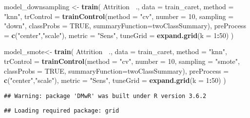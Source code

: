 \documentclass[
]{article}
\newenvironment{Shaded}{\begin{snugshade}}{\end{snugshade}}
\newcommand{\DataTypeTok}[1]{\textcolor[rgb]{0.13,0.29,0.53}{#1}}
\newcommand{\DecValTok}[1]{\textcolor[rgb]{0.00,0.00,0.81}{#1}}
\newcommand{\KeywordTok}[1]{\textcolor[rgb]{0.13,0.29,0.53}{\textbf{#1}}}
\newcommand{\NormalTok}[1]{#1}
\newcommand{\OperatorTok}[1]{\textcolor[rgb]{0.81,0.36,0.00}{\textbf{#1}}}
\newcommand{\OtherTok}[1]{\textcolor[rgb]{0.56,0.35,0.01}{#1}}
\newcommand{\StringTok}[1]{\textcolor[rgb]{0.31,0.60,0.02}{#1}}
\begin{document}
\begin{Shaded}
\begin{Highlighting}[]
\NormalTok{model_downsampling <-}\StringTok{ }\KeywordTok{train}\NormalTok{(}
\NormalTok{  Attrition }\OperatorTok{~}\NormalTok{., }\DataTypeTok{data =}\NormalTok{ train_caret, }\DataTypeTok{method =} \StringTok{"knn"}\NormalTok{,}
  \DataTypeTok{trControl =} \KeywordTok{trainControl}\NormalTok{(}\DataTypeTok{method =} \StringTok{"cv"}\NormalTok{,}
                           \DataTypeTok{number =} \DecValTok{10}\NormalTok{,}
                           \DataTypeTok{sampling =} \StringTok{"down"}\NormalTok{,}
                           \DataTypeTok{classProbs =} \OtherTok{TRUE}\NormalTok{,}
                           \DataTypeTok{summaryFunction=}\NormalTok{twoClassSummary),}
  \DataTypeTok{preProcess =} \KeywordTok{c}\NormalTok{(}\StringTok{"center"}\NormalTok{,}\StringTok{"scale"}\NormalTok{),}
  \DataTypeTok{metric =} \StringTok{"Sens"}\NormalTok{,}
  \DataTypeTok{tuneGrid =} \KeywordTok{expand.grid}\NormalTok{(}\DataTypeTok{k =} \DecValTok{1}\OperatorTok{:}\DecValTok{50}\NormalTok{)}
\NormalTok{  )}

\NormalTok{model_smote<-}\StringTok{ }\KeywordTok{train}\NormalTok{(}
\NormalTok{  Attrition }\OperatorTok{~}\NormalTok{., }\DataTypeTok{data =}\NormalTok{ train_caret, }\DataTypeTok{method =} \StringTok{"knn"}\NormalTok{,}
  \DataTypeTok{trControl =} \KeywordTok{trainControl}\NormalTok{(}\DataTypeTok{method =} \StringTok{"cv"}\NormalTok{,}
                           \DataTypeTok{number =} \DecValTok{10}\NormalTok{,}
                           \DataTypeTok{sampling =} \StringTok{"smote"}\NormalTok{,}
                           \DataTypeTok{classProbs =} \OtherTok{TRUE}\NormalTok{,}
                           \DataTypeTok{summaryFunction=}\NormalTok{twoClassSummary),}
  \DataTypeTok{preProcess =} \KeywordTok{c}\NormalTok{(}\StringTok{"center"}\NormalTok{,}\StringTok{"scale"}\NormalTok{),}
  \DataTypeTok{metric =} \StringTok{"Sens"}\NormalTok{,}
  \DataTypeTok{tuneGrid =} \KeywordTok{expand.grid}\NormalTok{(}\DataTypeTok{k =} \DecValTok{1}\OperatorTok{:}\DecValTok{50}\NormalTok{)}
\NormalTok{  )}
\end{Highlighting}
\end{Shaded}

\begin{verbatim}
## Warning: package 'DMwR' was built under R version 3.6.2
\end{verbatim}

\begin{verbatim}
## Loading required package: grid
\end{verbatim}
\end{document}
